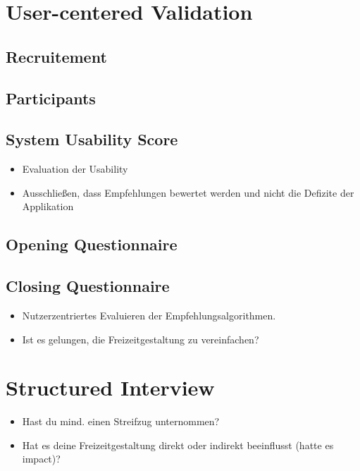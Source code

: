 \documentclass[12pt,numbers=noenddot,parskip,bibliography=totocnumbered,listof=totocnumbered]{scrreprt}
\begin{document}
\section{User-centered Validation}

\subsection{Recruitement}

\subsection{Participants}

\subsection{System Usability Score}
\begin{itemize} 
	\item Evaluation der Usability
	\item Ausschließen, dass Empfehlungen bewertet werden und nicht die Defizite der Applikation
\end{itemize} 

\subsection{Opening Questionnaire}

\subsection{Closing Questionnaire}
\begin{itemize} 
	\item Nutzerzentriertes Evaluieren der Empfehlungsalgorithmen.
	\item Ist es gelungen, die Freizeitgestaltung zu vereinfachen?
\end{itemize} 

\section{Structured Interview}
\begin{itemize} 
	\item Hast du mind. einen Streifzug unternommen?
	\item Hat es deine Freizeitgestaltung direkt oder indirekt beeinflusst (hatte es impact)?
\end{itemize}
\end{document}
